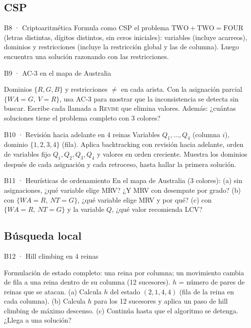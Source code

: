 \subsection{CSP}

\begin{ejercicio}{B8 · Criptoaritmética }
Formula como CSP el problema $\mathrm{TWO}+\mathrm{TWO}=\mathrm{FOUR}$ (letras distintas, dígitos
distintos, sin ceros iniciales): variables (incluye acarreos), dominios y restricciones (incluye la
restricción global y las de columna). Luego encuentra una solución razonando con las restricciones.
\end{ejercicio}

\begin{ejercicio}{B9 · AC-3 en el mapa de Australia }
\begin{center}\figAustralia\end{center}
Dominios $\{R,G,B\}$ y restricciones $\ne$ en cada arista. Con la asignación parcial
$\{WA=G,\ V=R\}$, usa AC-3 para mostrar que la inconsistencia se detecta sin buscar.
Escribe cada llamada a \textsc{Revise} que elimina valores. Además: ¿cuántas soluciones tiene
el problema completo con 3 colores?
\end{ejercicio}

\begin{ejercicio}{B10 · Revisión hacia adelante en 4 reinas }
Variables $Q_1,\dots,Q_4$ (columna $i$), dominio $\{1,2,3,4\}$ (fila). Aplica backtracking con
revisión hacia adelante, orden de variables fijo $Q_1,Q_2,Q_3,Q_4$ y valores en orden creciente.
Muestra los dominios después de cada asignación y cada retroceso, hasta hallar la primera solución.
\end{ejercicio}

\begin{ejercicio}{B11 · Heurísticas de ordenamiento }
En el mapa de Australia (3 colores):
(a) sin asignaciones, ¿qué variable elige MRV? ¿Y MRV con desempate por grado?
(b) con $\{WA=R,\ NT=G\}$, ¿qué variable elige MRV y por qué?
(c) con $\{WA=R,\ NT=G\}$ y la variable $Q$, ¿qué valor recomienda LCV?
\end{ejercicio}

\subsection{Búsqueda local}

\begin{ejercicio}{B12 · Hill climbing en 4 reinas }
\begin{center}\end{center}
Formulación de estado completo: una reina por columna; un movimiento cambia de fila a una reina
dentro de su columna (12 sucesores). $h$ = número de pares de reinas que se atacan.
(a) Calcula $h$ del estado $(2,1,4,4)$ (fila de la reina en cada columna).
(b) Calcula $h$ para los 12 sucesores y aplica un paso de hill climbing de máximo descenso.
(c) Continúa hasta que el algoritmo se detenga. ¿Llega a una solución?
\end{ejercicio}

